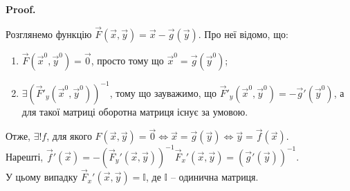 \documentclass[a4paper, 10pt]{article}
\makeatletter
\def\qed{$\blacksquare$}
\theoremstyle{theoremdd}
\theoremstyle{theoremdd}
\theoremstyle{theoremdd}
\theoremstyle{theoremdd}
\theoremstyle{theoremdd}
\theoremstyle{theoremdd}
\theoremstyle{theoremdd}
\theoremstyle{theoremdd}
\theoremstyle{theoremdd}
\renewenvironment{proof}[1][Proof.\\]{\par
\pushQED{\hfill \qed}%
\normalfont \topsep6\p@\@plus6\p@\relax
\trivlist
\item\relax
{\bfseries
#1\@addpunct{.}}\hspace\labelsep\ignorespaces
}{%
\popQED\endtrivlist\@endpefalse
}
\makeatother
\begin{document}
\begin{proof}
Розглянемо функцію $\vec{F}(\vec{x},\vec{y}) = \vec{x} - \vec{g}(\vec{y})$. Про неї відомо, що:
\begin{enumerate}[nosep,wide=0pt,label={\arabic*)}]
\item $\vec{F}(\vec{x}^0,\vec{y}^0) = \vec{0}$, просто тому що $\vec{x}^0 = \vec{g}(\vec{y}^0)$;
\item $\exists (\vec{F}'_y(\vec{x}^0,\vec{y}^0))^{-1}$, тому що зауважимо, що $\vec{F}'_y(\vec{x}^0,\vec{y}^0) = -\vec{g}'(\vec{y}^0)$, а для такої матриці оборотна матриця існує за умовою.
\end{enumerate}
Отже, $\exists! f$, для якого $F(\vec{x},\vec{y}) = \vec{0} \iff \vec{x} = \vec{g}(\vec{y}) \iff \vec{y} = \vec{f}(\vec{x})$.\\
Нарешті, $\vec{f}'(\vec{x}) = -(\vec{F}_y'(\vec{x},\vec{y}))^{-1} \vec{F}_x'(\vec{x},\vec{y}) = (\vec{g}'(\vec{y}))^{-1}$.\\
У цьому випадку $\vec{F}_x'(\vec{x},\vec{y}) = \mathbb{I}$, де $\mathbb{I}$ -- одинична матриця.
\end{proof}
\end{document}
